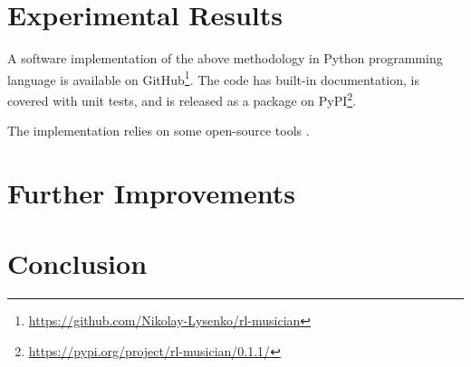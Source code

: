 \documentclass{article}
\begin{document}
\section{Experimental Results}
\label{sec:results}

A software implementation of the above methodology in Python programming language is available on GitHub\footnote{\url{https://github.com/Nikolay-Lysenko/rl-musician}}. The code has built-in documentation, is covered with unit tests, and is released as a package on PyPI\footnote{\url{https://pypi.org/project/rl-musician/0.1.1/}}.

The implementation relies on some open-source tools \cite{brockman2016openai,chollet2015keras,oliphant2006guide,raffel2014intuitive,dong2018pypianoroll}.


\section{Further Improvements}
\label{sec:improvements}


\section{Conclusion}
\label{sec:conclusion}


  

\end{document}
